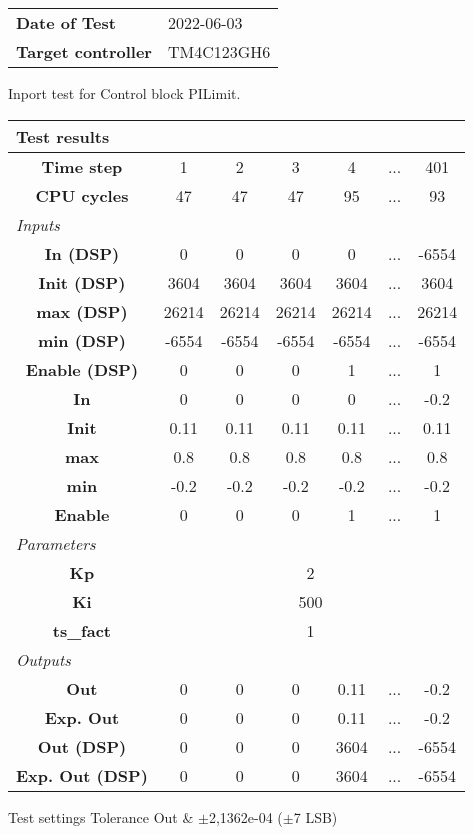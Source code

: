 \begin{tabular}{l l}
\textbf{Date of Test} & 2022-06-03 \tabularnewline
\textbf{Target controller} & TM4C123GH6 \tabularnewline
\end{tabular}
\vspace{1ex}
Inport test for Control block PILimit.

\vspace{1em}
\begin{tabularx}{\textwidth}{|c|c|c|c|c|>{\centering\arraybackslash}X|c|}
\hline
\multicolumn{7}{|l|}{\cellcolor[gray]{0.8}\textbf{Test results}} \tabularnewline \hline
\textbf{Time step} & 1 & 2 & 3 & 4 & ... & 401 \tabularnewline \hline
\textbf{CPU cycles} & 47 & 47 & 47 & 95 & ... & 93 \tabularnewline \hline
\multicolumn{7}{|l|}{\cellcolor[gray]{0.9}\textit{Inputs}} \tabularnewline \hline
\textbf{In (DSP)} & 0 & 0 & 0 & 0 & ... & -6554 \tabularnewline \hline
\textbf{Init (DSP)} & 3604 & 3604 & 3604 & 3604 & ... & 3604 \tabularnewline \hline
\textbf{max (DSP)} & 26214 & 26214 & 26214 & 26214 & ... & 26214 \tabularnewline \hline
\textbf{min (DSP)} & -6554 & -6554 & -6554 & -6554 & ... & -6554 \tabularnewline \hline
\textbf{Enable (DSP)} & 0 & 0 & 0 & 1 & ... & 1 \tabularnewline \hline
\textbf{In} & 0 & 0 & 0 & 0 & ... & -0.2 \tabularnewline \hline
\textbf{Init} & 0.11 & 0.11 & 0.11 & 0.11 & ... & 0.11 \tabularnewline \hline
\textbf{max} & 0.8 & 0.8 & 0.8 & 0.8 & ... & 0.8 \tabularnewline \hline
\textbf{min} & -0.2 & -0.2 & -0.2 & -0.2 & ... & -0.2 \tabularnewline \hline
\textbf{Enable} & 0 & 0 & 0 & 1 & ... & 1 \tabularnewline \hline
\multicolumn{7}{|l|}{\cellcolor[gray]{0.9}\textit{Parameters}} \tabularnewline \hline
\textbf{Kp} & \multicolumn{6}{c|}{2} \tabularnewline \hline
\textbf{Ki} & \multicolumn{6}{c|}{500} \tabularnewline \hline
\textbf{ts\_fact} & \multicolumn{6}{c|}{1} \tabularnewline \hline
\multicolumn{7}{|l|}{\cellcolor[gray]{0.9}\textit{Outputs}} \tabularnewline \hline
\textbf{Out} & 0 & 0 & 0 & 0.11 & ... & -0.2 \tabularnewline \hline
\textbf{Exp. Out} & 0 & 0 & 0 & 0.11 & ... & -0.2 \tabularnewline \hline
\textbf{Out (DSP)} & 0 & 0 & 0 & 3604 & ... & -6554 \tabularnewline \hline
\textbf{Exp. Out (DSP)} & 0 & 0 & 0 & 3604 & ... & -6554 \tabularnewline \hline
\end{tabularx}
\vspace{1ex}

\begin{XtoCtabular}{Test settings}
Tolerance Out & $\pm$2,1362e-04 ($\pm$7 LSB) \tabularnewline \hline
\end{XtoCtabular}

